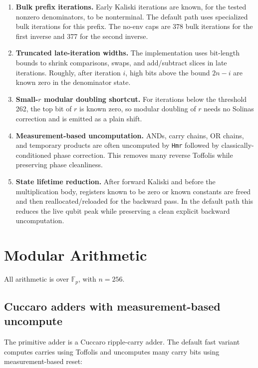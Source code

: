 \documentclass[11pt]{article}
\newcommand{\Fp}{\mathbb{F}_p}
\begin{document}
\begin{enumerate}
  \item \textbf{Bulk prefix iterations.}
  Early Kaliski iterations are known, for the tested nonzero denominators, to be
  nonterminal.  The default path uses specialized bulk iterations for this
  prefix.  The no-env caps are 378 bulk iterations for the first inverse and
  377 for the second inverse.

  \item \textbf{Truncated late-iteration widths.}
  The implementation uses bit-length bounds to shrink comparisons, swaps, and
  add/subtract slices in late iterations.  Roughly, after iteration \(i\), high
  bits above the bound \(2n-i\) are known zero in the denominator state.

  \item \textbf{Small-\(r\) modular doubling shortcut.}
  For iterations below the threshold 262, the top bit of \(r\) is known zero,
  so modular doubling of \(r\) needs no Solinas correction and is emitted as a
  plain shift.

  \item \textbf{Measurement-based uncomputation.}
  ANDs, carry chains, OR chains, and temporary products are often uncomputed by
  \texttt{Hmr} followed by classically-conditioned phase correction.  This
  removes many reverse Toffolis while preserving phase cleanliness.

  \item \textbf{State lifetime reduction.}
  After forward Kaliski and before the multiplication body, registers known to
  be zero or known constants are freed and then reallocated/reloaded for the
  backward pass.  In the default path this reduces the live qubit peak while
  preserving a clean explicit backward uncomputation.
\end{enumerate}

\section{Modular Arithmetic}

All arithmetic is over \(\Fp\), with \(n=256\).

\subsection{Cuccaro adders with measurement-based uncompute}

The primitive adder is a Cuccaro ripple-carry adder.  The default fast variant
computes carries using Toffolis and uncomputes many carry bits using
measurement-based reset:
\end{document}
